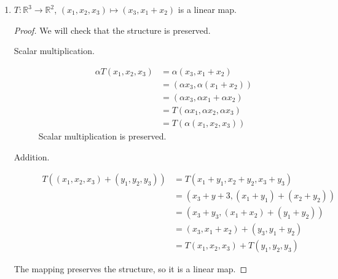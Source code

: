 \documentclass{article}
\renewcommand{\a}{\alpha}
\newcommand{\R}{\mathbb{R}}
\begin{document}
\begin{enumerate}
\begin{enumerate}
            \item $T : \R^3 \to \R^2$, $(x_1, x_2, x_3) \mapsto (x_3, x_1 + x_2)$ is a linear map.
                \begin{proof}
                    We will check that the structure is preserved.
                    \begin{description}
                        \item[Scalar multiplication.]
                            \begin{align*}
                                \a T(x_1, x_2, x_3) &= \a (x_3, x_1 + x_2) \\
                                                    &= (\a x_3, \a (x_1 + x_2)) \\
                                                    &= (\a x_3, \a x_1 + \a x_2) \\
                                                    &= T(\a x_1, \a x_2, \a x_3) \\
                                                    &= T(\a (x_1, x_2, x_3))
                            \end{align*}
                            Scalar multiplication is preserved.
                        \item[Addition.]
                            \begin{align*}
                                T((x_1, x_2, x_3) + (y_1, y_2, y_3)) &= T(x_1 + y_1, x_2 + y_2, x_3 + y_3) \\
                                                                     &= (x_3 + y+3, (x_1 + y_1) + (x_2 + y_2)) \\
                                                                     &= (x_3 + y_3, (x_1 + x_2) + (y_1 + y_2)) \\
                                                                     &= (x_3, x_1 + x_2) + (y_3, y_1 + y_2) \\
                                                                     &= T(x_1, x_2, x_3) + T(y_1, y_2, y_3)
                            \end{align*}
                    \end{description}
                    The mapping preserves the structure, so it is a linear map.
                \end{proof}


\end{enumerate}
\end{enumerate}
\end{document}
